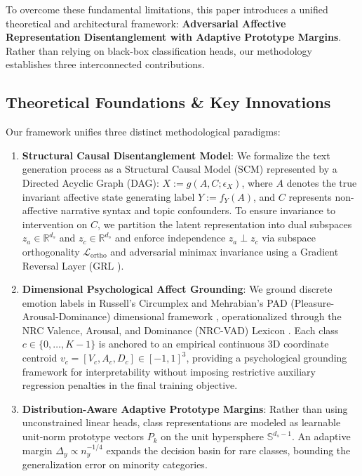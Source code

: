 \documentclass[journal,twocolumn]{article}
\begin{document}
To overcome these fundamental limitations, this paper introduces a unified theoretical and architectural framework: \textbf{Adversarial Affective Representation Disentanglement with Adaptive Prototype Margins}. Rather than relying on black-box classification heads, our methodology establishes three interconnected contributions.

\subsection{Theoretical Foundations \& Key Innovations}
Our framework unifies three distinct methodological paradigms:
\begin{enumerate}
    \item \textbf{Structural Causal Disentanglement Model}: We formalize the text generation process as a Structural Causal Model (SCM) represented by a Directed Acyclic Graph (DAG): $X := g(A, C; \epsilon_X)$, where $A$ denotes the true invariant affective state generating label $Y := f_Y(A)$, and $C$ represents non-affective narrative syntax and topic confounders. To ensure invariance to intervention on $C$, we partition the latent representation into dual subspaces $z_a \in \mathbb{R}^{d_s}$ and $z_c \in \mathbb{R}^{d_s}$ and enforce independence $z_a \perp z_c$ via subspace orthogonality $\mathcal{L}_{\text{ortho}}$ and adversarial minimax invariance using a Gradient Reversal Layer (GRL \cite{ganin2016domain}).
    \item \textbf{Dimensional Psychological Affect Grounding}: We ground discrete emotion labels in Russell's Circumplex and Mehrabian's PAD (Pleasure-Arousal-Dominance) dimensional framework \cite{russell1980circumplex, mehrabian1996pleasure}, operationalized through the NRC Valence, Arousal, and Dominance (NRC-VAD) Lexicon \cite{mohammad2018vad}. Each class $c \in \{0, \dots, K-1\}$ is anchored to an empirical continuous 3D coordinate centroid $v_c = [V_c, A_c, D_c] \in [-1, 1]^3$, providing a psychological grounding framework for interpretability without imposing restrictive auxiliary regression penalties in the final training objective.
    \item \textbf{Distribution-Aware Adaptive Prototype Margins}: Rather than using unconstrained linear heads, class representations are modeled as learnable unit-norm prototype vectors $P_k$ on the unit hypersphere $\mathbb{S}^{d_s-1}$. An adaptive margin $\Delta_y \propto n_y^{-1/4}$ expands the decision basin for rare classes, bounding the generalization error on minority categories.
\end{enumerate}
\end{document}
